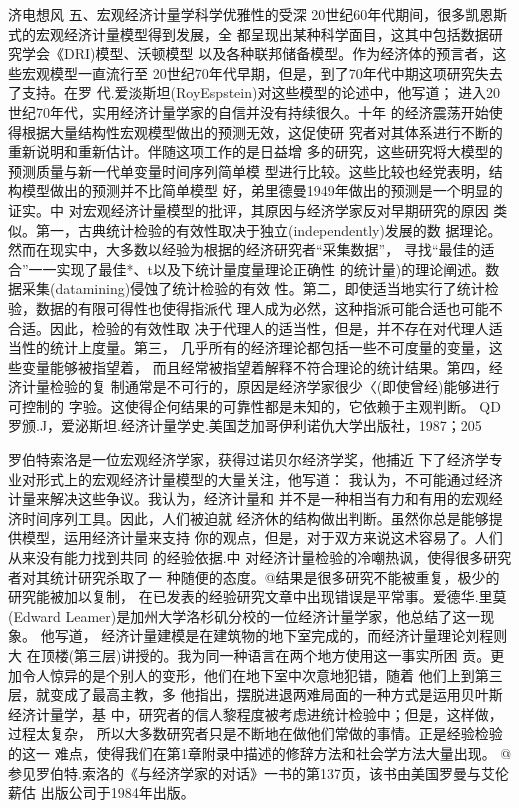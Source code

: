济电想风
五、宏观经济计量学科学优雅性的受深
20世纪60年代期间，很多凯恩斯式的宏观经济计量模型得到发展，全
都呈现出某种科学面目，这其中包括数据研究学会《DRI)模型、沃顿模型
以及各种联邦储备模型。作为经济体的预言者，这些宏观模型一直流行至
20世纪70年代早期，但是，到了70年代中期这项研究失去了支持。在罗
代.爱淡斯坦(RoyEspstein)对这些模型的论述中，他写道；
进入20世纪70年代，实用经济计量学家的自信并没有持续很久。十年
的经济震荡开始使得根据大量结构性宏观模型做出的预测无效，这促使研
究者对其体系进行不断的重新说明和重新估计。伴随这项工作的是日益增
多的研究，这些研究将大模型的预测质量与新一代单变量时间序列简单模
型进行比较。这些比较也经党表明，结构模型做出的预测并不比简单模型
好，弟里德曼1949年做出的预测是一个明显的证实。中
对宏观经济计量模型的批评，其原因与经济学家反对早期研究的原因
类似。第一，古典统计检验的有效性取决于独立(independently)发展的数
据理论。然而在现实中，大多数以经验为根据的经济研究者“采集数据”，
寻找“最佳的适合”一一实现了最佳*、t以及下统计量度量理论正确性
的统计量)的理论阐述。数据采集(datamining)侵蚀了统计检验的有效
性。第二，即使适当地实行了统计检验，数据的有限可得性也使得指派代
理人成为必然，这种指派可能合适也可能不合适。因此，检验的有效性取
决于代理人的适当性，但是，并不存在对代理人适当性的统计上度量。第三，
几乎所有的经济理论都包括一些不可度量的变量，这些变量能够被指望着，
而且经常被指望着解释不符合理论的统计结果。第四，经济计量检验的复
制通常是不可行的，原因是经济学家很少〈(即使曾经)能够进行可控制的
字验。这使得企何结果的可靠性都是未知的，它依赖于主观判断。
QD罗颁.J，爱泌斯坦.经济计量学史.美国芝加哥伊利诺仇大学出版社，1987；205

罗伯特索洛是一位宏观经济学家，获得过诺贝尔经济学奖，他捕近
下了经济学专业对形式上的宏观经济计量模型的大量关注，他写道：
我认为，不可能通过经济计量来解决这些争议。我认为，经济计量和
并不是一种相当有力和有用的宏观经济时间序列工具。因此，人们被迫就
经济休的结构做出判断。虽然你总是能够提供模型，运用经济计量来支持
你的观点，但是，对于双方来说这术容易了。人们从来没有能力找到共同
的经验依据.中
对经济计量检验的冷嘲热讽，使得很多研究者对其统计研究杀取了一
种随便的态度。@结果是很多研究不能被重复，极少的研究能被加以复制，
在已发表的经验研究文章中出现错误是平常事。爱德华.里莫(Edward
Leamer)是加州大学洛杉矶分校的一位经济计量学家，他总结了这一现象。
他写道，
经济计量建模是在建筑物的地下室完成的，而经济计量理论刘程则大
在顶楼(第三层)讲授的。我为同一种语言在两个地方使用这一事实所困
贡。更加令人惊异的是个别人的变形，他们在地下室中次意地犯错，随着
他们上到第三层，就变成了最高主教，多
他指出，摆脱进退两难局面的一种方式是运用贝叶斯经济计量学，基
中，研究者的信人黎程度被考虑进统计检验中；但是，这样做，过程太复杂，
所以大多数研究者只是不断地在做他们常做的事情。正是经验检验的这一
难点，使得我们在第1章附录中描述的修辞方法和社会学方法大量出现。
@参见罗伯特.索洛的《与经济学家的对话》一书的第137页，该书由美国罗曼与艾伦薪估
出版公司于1984年出版。

